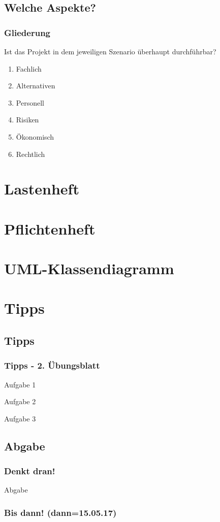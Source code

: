 \documentclass[18pt]{beamer}
\begin{document}
	\subsection{Welche Aspekte?}
	\begin{frame}
		\frametitle{Gliederung}
		Ist das Projekt in dem jeweiligen Szenario überhaupt durchführbar?
		\begin{enumerate}
			\item \pause Fachlich \pause 
			\item Alternativen \pause
			\item Personell \pause 
			\item Risiken \pause
			\item Ökonomisch \pause 
			\item Rechtlich 
		\end{enumerate}
	\end{frame}

\section{Lastenheft}

\section{Pflichtenheft}


\section{UML-Klassendiagramm}
		
\section{Tipps}
	\subsection{Tipps}
	\begin{frame}
		\frametitle{Tipps - 2. Übungsblatt}
		\begin{small}
			\begin{exampleblock}{Aufgabe 1}
			\end{exampleblock}
			\pause
			\begin{exampleblock}{Aufgabe 2}
			\end{exampleblock}
			\pause
			\begin{exampleblock}{Aufgabe 3}
			\end{exampleblock}
		\end{small}
	\end{frame}
	
	\subsection{Abgabe}
	\begin{frame}
		\frametitle{Denkt dran!}
		\begin{alertblock}{Abgabe}
		\end{alertblock}
	\end{frame}
		
	\begin{frame}
		\frametitle{Bis dann! (dann=15.05.17)}
		\centering
	\end{frame}
\end{document}
